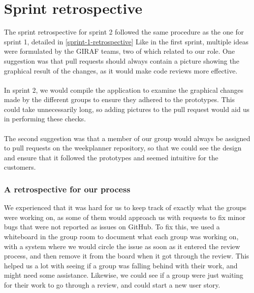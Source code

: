 \section{Sprint retrospective}\label{sec:sprint-2-retrospective}
The sprint retrospective for sprint 2 followed the same procedure as the one for sprint 1, detailed in \autoref{sprint-1-retrospective}
Like in the first sprint, multiple ideas were formulated by the GIRAF teams, two of which related to our role.
One suggestion was that pull requests should always contain a picture showing the graphical result of the changes, as it would make code reviews more effective.
\\\\
In sprint 2, we would compile the application to examine the graphical changes made by the different groups to ensure they adhered to the prototypes.
This could take unnecessarily long, so adding pictures to the pull request would aid us in performing these checks.
\\\\
The second suggestion was that a member of our group would always be assigned to pull requests on the weekplanner repository, so that we could see the design and ensure that it followed the prototypes and seemed intuitive for the customers.

\subsubsection{A retrospective for our process}
We experienced that it was hard for us to keep track of exactly what the groups were working on, as some of them would approach us with requests to fix minor bugs that were not reported as issues on GitHub.
To fix this, we used a whiteboard in the group room to document what each group was working on, with a system where we would circle the issue as soon as it entered the review process, and then remove it from the board when it got through the review.
This helped us a lot with seeing if a group was falling behind with their work, and might need some assistance.
Likewise, we could see if a group were just waiting for their work to go through a review, and could start a new user story.
